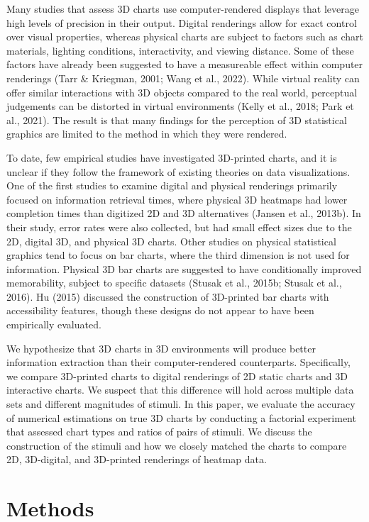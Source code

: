 \documentclass[phd]{nuthesis}
\begin{document}
Many studies that assess 3D charts use computer-rendered displays that
leverage high levels of precision in their output. Digital renderings
allow for exact control over visual properties, whereas physical charts
are subject to factors such as chart materials, lighting conditions,
interactivity, and viewing distance. Some of these factors have already
been suggested to have a measureable effect within computer renderings
(Tarr \& Kriegman, 2001; Wang et al., 2022). While virtual reality can
offer similar interactions with 3D objects compared to the real world,
perceptual judgements can be distorted in virtual environments (Kelly et
al., 2018; Park et al., 2021). The result is that many findings for the
perception of 3D statistical graphics are limited to the method in which
they were rendered.

To date, few empirical studies have investigated 3D-printed charts, and
it is unclear if they follow the framework of existing theories on data
visualizations. One of the first studies to examine digital and physical
renderings primarily focused on information retrieval times, where
physical 3D heatmaps had lower completion times than digitized 2D and 3D
alternatives (Jansen et al., 2013b). In their study, error rates were
also collected, but had small effect sizes due to the 2D, digital 3D,
and physical 3D charts. Other studies on physical statistical graphics
tend to focus on bar charts, where the third dimension is not used for
information. Physical 3D bar charts are suggested to have conditionally
improved memorability, subject to specific datasets (Stusak et al.,
2015b; Stusak et al., 2016). Hu (2015) discussed the construction of
3D-printed bar charts with accessibility features, though these designs
do not appear to have been empirically evaluated.

We hypothesize that 3D charts in 3D environments will produce better
information extraction than their computer-rendered counterparts.
Specifically, we compare 3D-printed charts to digital renderings of 2D
static charts and 3D interactive charts. We suspect that this difference
will hold across multiple data sets and different magnitudes of stimuli.
In this paper, we evaluate the accuracy of numerical estimations on true
3D charts by conducting a factorial experiment that assessed chart types
and ratios of pairs of stimuli. We discuss the construction of the
stimuli and how we closely matched the charts to compare 2D, 3D-digital,
and 3D-printed renderings of heatmap data.

\section{Methods}\label{methods-2}
\end{document}
